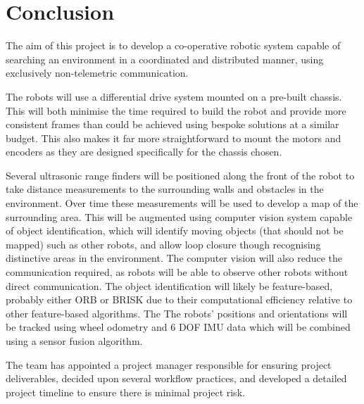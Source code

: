 
\section{Conclusion}\label{conclusion}
\thispagestyle{plain}

The aim of this project is to develop a co-operative robotic system capable of
searching an environment in a coordinated and distributed manner, using exclusively
non-telemetric communication.

The robots will use a differential drive system mounted on a pre-built chassis.
This will both minimise the time required to build the robot and provide more
consistent frames than could be achieved using bespoke solutions at a similar
budget. This also makes it far more straightforward to mount the motors and encoders
as they are designed specifically for the chassis chosen.

Several ultrasonic range finders will be positioned along the front of the robot
to take distance measurements to the surrounding walls and obstacles in the
environment. Over time these measurements will be used to develop a map of the
surrounding area. This will be augmented using computer vision system capable
of object identification, which will identify moving objects (that should not
be mapped) such as other robots, and allow loop closure though recognising
distinctive areas in the environment. The computer vision will also reduce the
communication required, as robots will be able to observe other robots without
direct communication. The object identification will likely be feature-based,
probably either ORB or BRISK due to their computational efficiency relative to
other feature-based algorithms. The The robots' positions and orientations will
be tracked using wheel odometry and 6 DOF IMU data which will be combined using
a sensor fusion algorithm.

The team has appointed a project manager responsible for ensuring project
deliverables, decided upon several workflow practices, and developed a detailed
project timeline to ensure there is minimal project risk.
